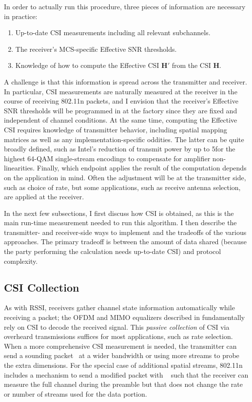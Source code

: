 In order to actually run this procedure, three pieces of information are necessary in practice:
\begin{enumerate}[parsep=1ex,itemsep=1ex,topsep=1ex]
	\item Up-to-date CSI measurements including all relevant subchannels.
	\item The receiver's MCS-specific Effective SNR thresholds.
	\item Knowledge of how to compute the Effective CSI $\mathbf{H}'$ from the CSI $\mathbf{H}$.
\end{enumerate}
A challenge is that this information is spread across the transmitter and receiver. In particular, CSI measurements are naturally measured at the receiver in the course of receiving 802.11n packets, and I envision that the receiver's Effective SNR thresholds will be programmed in at the factory since they are fixed and independent of channel conditions. At the same time, computing the Effective CSI requires knowledge of transmitter behavior, including spatial mapping matrices as well as any implementation-specific oddities. The latter can be quite broadly defined, such as Intel's reduction of transmit power by up to 5\dB for the highest 64-QAM single-stream encodings to compensate for amplifier non-linearities. Finally, which endpoint applies the result of the computation depends on the application in mind. Often the adjustment will be at the transmitter side, such as choice of rate, but some applications, such as receive antenna selection, are applied at the receiver.

In the next few subsections, I first discuss how CSI is obtained, as this is the main run-time measurement needed to run this algorithm. I then describe the transmitter- and receiver-side ways to implement  and the tradeoffs of the various approaches. The primary tradeoff is between the amount of data shared (because the party performing the calculation needs up-to-date CSI) and protocol complexity.

\subsection{CSI Collection}
As with RSSI, receivers gather channel state information automatically while receiving a packet; the OFDM and MIMO equalizers described in  fundamentally rely on CSI to decode the received signal. This \emph{passive collection} of CSI via overheard transmissions suffices for most applications, such as rate selection. When a more comprehensive CSI measurement is needed, the transmitter can send a sounding packet~\cite[\S20.3.13.1]{80211n} at a wider bandwidth or using more streams to probe the extra dimensions. For the special case of additional spatial streams, 802.11n includes a mechanism to send a modified packet with ~\cite[\S20.3.9.4.6]{80211n} such that the receiver can measure the full channel during the preamble but that does not change the rate or number of streams used for the data portion.

